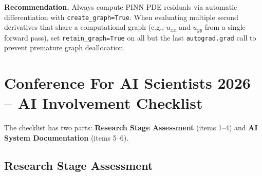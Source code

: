 \documentclass{article}
\begin{document}
\textbf{Recommendation.}
Always compute PINN PDE residuals via automatic differentiation with
\texttt{create\_graph=True}.
When evaluating multiple second derivatives that share a computational graph
(e.g., $u_{xx}$ and $u_{yy}$ from a single forward pass), set
\texttt{retain\_graph=True} on all but the last \texttt{autograd.grad} call
to prevent premature graph deallocation.

\newpage

\section*{Conference For AI Scientists 2026 -- AI Involvement Checklist}
\label{checklist_ai_involvement}

The checklist has two parts: \textbf{Research Stage Assessment} (items 1--4)
and \textbf{AI System Documentation} (items 5--6).

\subsection*{Research Stage Assessment}
\end{document}
